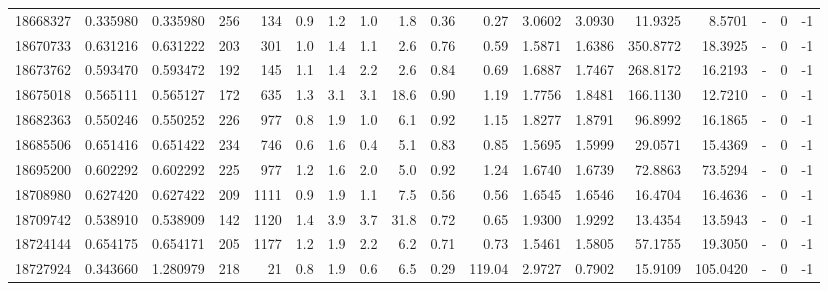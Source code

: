 \begin{tabular}{rrrrrrrrrrrrrrrlrr}
  18668327 & 0.335980 &   0.335980 &  256 &  134 &      0.9 &      1.2 &     1.0 &      1.8 &       0.36 &        0.27 &  3.0602 &  3.0930 &   11.9325 &    8.5701 &             - &        0 &         -1 \\
  18670733 & 0.631216 &   0.631222 &  203 &  301 &      1.0 &      1.4 &     1.1 &      2.6 &       0.76 &        0.59 &  1.5871 &  1.6386 &  350.8772 &   18.3925 &             - &        0 &         -1 \\
  18673762 & 0.593470 &   0.593472 &  192 &  145 &      1.1 &      1.4 &     2.2 &      2.6 &       0.84 &        0.69 &  1.6887 &  1.7467 &  268.8172 &   16.2193 &             - &        0 &         -1 \\
  18675018 & 0.565111 &   0.565127 &  172 &  635 &      1.3 &      3.1 &     3.1 &     18.6 &       0.90 &        1.19 &  1.7756 &  1.8481 &  166.1130 &   12.7210 &             - &        0 &         -1 \\
  18682363 & 0.550246 &   0.550252 &  226 &  977 &      0.8 &      1.9 &     1.0 &      6.1 &       0.92 &        1.15 &  1.8277 &  1.8791 &   96.8992 &   16.1865 &             - &        0 &         -1 \\
  18685506 & 0.651416 &   0.651422 &  234 &  746 &      0.6 &      1.6 &     0.4 &      5.1 &       0.83 &        0.85 &  1.5695 &  1.5999 &   29.0571 &   15.4369 &             - &        0 &         -1 \\
  18695200 & 0.602292 &   0.602292 &  225 &  977 &      1.2 &      1.6 &     2.0 &      5.0 &       0.92 &        1.24 &  1.6740 &  1.6739 &   72.8863 &   73.5294 &             - &        0 &         -1 \\
  18708980 & 0.627420 &   0.627422 &  209 & 1111 &      0.9 &      1.9 &     1.1 &      7.5 &       0.56 &        0.56 &  1.6545 &  1.6546 &   16.4704 &   16.4636 &             - &        0 &         -1 \\
  18709742 & 0.538910 &   0.538909 &  142 & 1120 &      1.4 &      3.9 &     3.7 &     31.8 &       0.72 &        0.65 &  1.9300 &  1.9292 &   13.4354 &   13.5943 &             - &        0 &         -1 \\
  18724144 & 0.654175 &   0.654171 &  205 & 1177 &      1.2 &      1.9 &     2.2 &      6.2 &       0.71 &        0.73 &  1.5461 &  1.5805 &   57.1755 &   19.3050 &             - &        0 &         -1 \\
  18727924 & 0.343660 &   1.280979 &  218 &   21 &      0.8 &      1.9 &     0.6 &      6.5 &       0.29 &      119.04 &  2.9727 &  0.7902 &   15.9109 &  105.0420 &             - &        0 &         -1 \\

\end{tabular}

